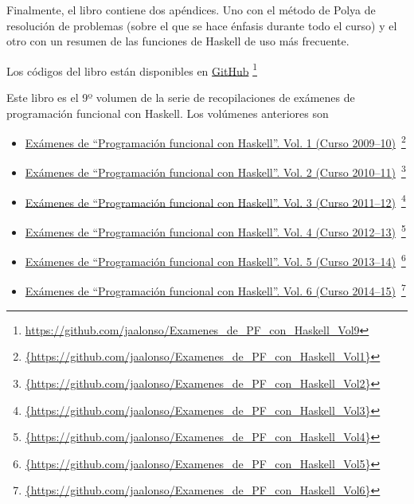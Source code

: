 \documentclass[a4paper,12pt,twoside]{book}
\begin{document}
Finalmente, el libro contiene dos apéndices. Uno con el método de Polya
de resolución de problemas (sobre el que se hace énfasis durante todo el
curso) y el otro con un resumen de las funciones de Haskell de uso más
frecuente.

Los códigos del libro están disponibles en
\href{https://github.com/jaalonso/Examenes_de_PF_con_Haskell_Vol9}
     {GitHub}
     \footnote{{\url{https://github.com/jaalonso/Examenes_de_PF_con_Haskell_Vol9}}}

Este libro es el 9º volumen de la serie de recopilaciones de
exámenes de programación funcional con Haskell. Los volúmenes anteriores son
\begin{itemize}
\item
  \href{https://github.com/jaalonso/Examenes_de_PF_con_Haskell_Vol1}
  {Exámenes de ``Programaci\'on funcional con Haskell''.
    Vol. 1 (Curso 2009--10)}\
    \footnote{\url{{https://github.com/jaalonso/Examenes_de_PF_con_Haskell_Vol1}}}

\item
  \href{https://github.com/jaalonso/Examenes_de_PF_con_Haskell_Vol2}
  {Exámenes de ``Programaci\'on funcional con Haskell''.
    Vol. 2 (Curso 2010--11)}\
    \footnote{\url{{https://github.com/jaalonso/Examenes_de_PF_con_Haskell_Vol2}}}

\item
  \href{https://github.com/jaalonso/Examenes_de_PF_con_Haskell_Vol3}
  {Exámenes de ``Programaci\'on funcional con Haskell''.
    Vol. 3 (Curso 2011--12)}\
    \footnote{\url{{https://github.com/jaalonso/Examenes_de_PF_con_Haskell_Vol3}}}

\item
  \href{https://github.com/jaalonso/Examenes_de_PF_con_Haskell_Vol4}
  {Exámenes de ``Programaci\'on funcional con Haskell''.
    Vol. 4 (Curso 2012--13)}\
    \footnote{\url{{https://github.com/jaalonso/Examenes_de_PF_con_Haskell_Vol4}}}

\item
  \href{https://github.com/jaalonso/Examenes_de_PF_con_Haskell_Vol5}
  {Exámenes de ``Programaci\'on funcional con Haskell''.
    Vol. 5 (Curso 2013--14)}\
    \footnote{\url{{https://github.com/jaalonso/Examenes_de_PF_con_Haskell_Vol5}}}

\item
  \href{https://github.com/jaalonso/Examenes_de_PF_con_Haskell_Vol6}
  {Exámenes de ``Programaci\'on funcional con Haskell''.
    Vol. 6 (Curso 2014--15)}\
    \footnote{\url{{https://github.com/jaalonso/Examenes_de_PF_con_Haskell_Vol6}}}


\end{itemize}
\end{document}
